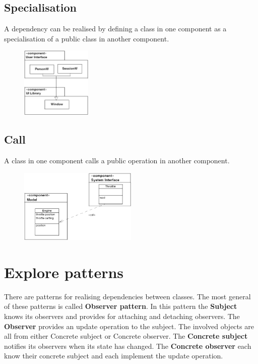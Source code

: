 \subsection{Specialisation}

A dependency can be realised by defining a class in one component as a specialisation of a public class in another component.

\begin{figure}[H]
    \centering
   \includegraphics[width=0.3\textwidth]{figures/connectionspecialization.png}
\end{figure}

\subsection{Call}

A class in one component calls a public operation in another component.

\begin{figure}[H]
    \centering
   \includegraphics[width=0.5\textwidth]{figures/connectioncall.png}
\end{figure}

\section{Explore patterns}

There are patterns for realising dependencies between classes. The most general of these patterns is called \textbf{Observer pattern}. In this pattern the \textbf{Subject} knows its observers and provides for attaching and detaching observers. The \textbf{Observer} provides an update operation to the subject. The involved objects are all from either Concrete subject or Concrete observer. The \textbf{Concrete subject} notifies its observers when its state has changed. The \textbf{Concrete observer} each know their concrete subject and each implement the update operation.

